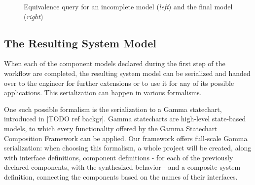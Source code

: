 \begin{figure}[!ht] 
	\centering
	\caption{Equivalence query for an incomplete model (\textit{left}) and the final model (\textit{right})}
	\label{fig_methodology_eqex}
\end{figure}

\subsection{The Resulting System Model} \label{subs_resultingmodel}
When each of the component models declared during the first step of the workflow are completed, the resulting system model can be serialized and handed over to the engineer for further extensions or to use it for any of its possible applications. This serialization can happen in various formalisms.

One such possible formalism is the serialization to a Gamma statechart, introduced in [TODO ref backgr]. Gamma statecharts are high-level state-based models, to which every functionality offered by the Gamma Statechart Composition Framework can be applied. Our framework offers full-scale Gamma serialization: when choosing this formalism, a whole project will be created, along with interface definitions, component definitions - for each of the previously declared components, with the synthesized behavior - and a composite system definition, connecting the components based on the names of their interfaces.

